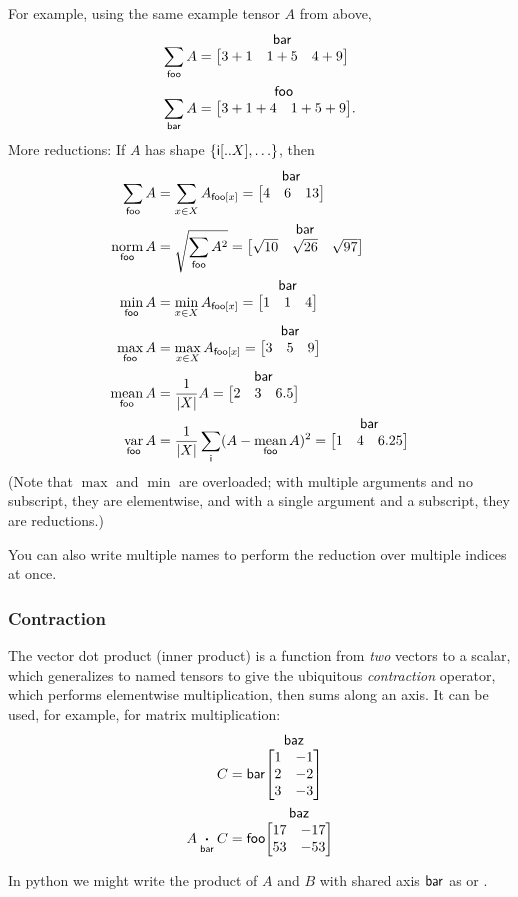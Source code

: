 \documentclass{article}
\makeatletter
\newcommand{\tuple}[1]{\{#1\}}
\newcommand{\nmatrix}[3]{\name{#1}\begin{array}[b]{@{}c@{}}\name{#2}\\\begin{bmatrix}#3\end{bmatrix}\end{array}}
\makeatother
\begin{document}
For example, using the same example tensor $A$ from above,
\begin{align*}
\nsum{foo} A &= \nmatrix{}{bar}{
  3+1 & 1+5 & 4+9
} \\
\nsum{bar} A &= \nmatrix{}{foo}{
  3+1+4 & 1+5+9
}.
\end{align*}
More reductions: If $A$ has shape $\tuple{\nset{i}{..X}, \ldots}$, then
\begin{align*}
  \nsum{foo} A &= \sum_{x \in X} A_{\nidx{foo}{x}} = \nmatrix{}{bar}{4 & 6 & 13} \\
  \nfun{foo}{norm} A &= \sqrt{\nsum{foo} A^2} = \nmatrix{}{bar}{\sqrt{10} & \sqrt{26} & \sqrt{97}} \\
  \nfun{foo}{min} A &= \min_{x \in X} A_{\nidx{foo}{x}} = \nmatrix{}{bar}{1 & 1 & 4} \\
  \nfun{foo}{max} A &= \max_{x \in X} A_{\nidx{foo}{x}} = \nmatrix{}{bar}{3 & 5 & 9} \\
  \nfun{foo}{mean} A &= \frac{1}{|X|} A = \nmatrix{}{bar}{2 & 3 & 6.5} \\
  \nfun{foo}{var} A &= \frac1{|X|} \nsum{i} (A - \nfun{foo}{mean} A)^2 = \nmatrix{}{bar}{1 & 4 & 6.25}
\end{align*}
(Note that $\max$ and $\min$ are overloaded; with multiple arguments and no subscript, they are elementwise, and with a single argument and a subscript, they are reductions.)

You can also write multiple names to perform the reduction over multiple indices at once.

\subsubsection{Contraction}

The vector dot product (inner product) is a function from \emph{two} vectors to a scalar, which generalizes to named tensors to give the ubiquitous \emph{contraction} operator, which performs elementwise multiplication, then sums along an axis. It can be used, for example, for matrix multiplication:
\begin{align*}
C &= \nmatrix{bar}{baz}{
  1 & -1 \\ 2 & -2 \\ 3 & -3
} \\
A \ndot{bar} C &= \nmatrix{foo}{baz}{
  17 & -17 \\
  53 & -53
}
\end{align*}

In python we might write the product of $A$ and $B$ with shared axis $\mathsf{bar}$ as  or .
\end{document}
